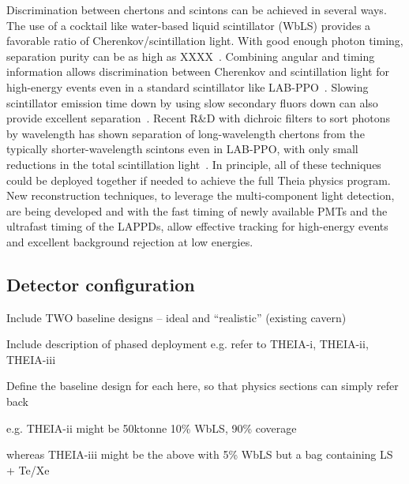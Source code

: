 Discrimination between chertons and scintons can be achieved in several ways.
The use of a cocktail like water-based liquid scintillator (WbLS) provides a
favorable ratio of Cherenkov/scintillation light. With good enough photon
timing, separation purity can be as high as XXXX~\cite{chess}. Combining angular
and timing information allows discrimination between Cherenkov and
scintillation light for high-energy events even in a standard scintillator like
LAB-PPO~\cite{chess}.  Slowing scintillator emission time down by using slow
secondary fluors down can also provide excellent separation~\cite{jack}.
Recent R\&D with dichroic filters to sort photons by wavelength has shown
separation of long-wavelength chertons from the typically shorter-wavelength
scintons even in LAB-PPO, with only small reductions in the total scintillation
light~\cite{dichoicjinst}.  In principle, all of these techniques could be
deployed together if needed to achieve the full Theia physics program.  New
reconstruction techniques, to leverage the multi-component light detection, are
being developed and with the fast timing of newly available PMTs and the
ultrafast timing of the LAPPDs, allow effective tracking for high-energy
events and excellent background rejection at low energies.



\subsection{Detector configuration}
Include TWO baseline designs -- ideal and ``realistic'' (existing cavern)

Include description of phased deployment
e.g. refer to THEIA-i, THEIA-ii, THEIA-iii

Define the baseline design for each here, so that physics sections can simply refer back

e.g. THEIA-ii might be 50ktonne 10\% WbLS, 90\% coverage

whereas THEIA-iii might be the above with 5\% WbLS but a bag containing LS + Te/Xe
